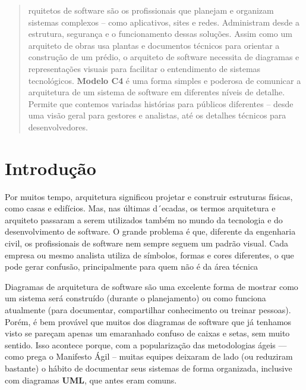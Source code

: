 \documentclass[a4paper,11pt]{article}
\begin{document}
	
\maketitle %
\thispagestyle{fancy} %


\begin{abstract}	
	rquitetos de software são os profissionais que planejam e organizam sistemas complexos -- como aplicativos, sites e redes. Administram desde a estrutura, segurança e o funcionamento dessas soluções. Assim como um arquiteto de obras usa plantas e documentos
	técnicos para orientar a construção de um prédio, o arquiteto de software necessita de diagramas e representações visuais para facilitar o entendimento de sistemas tecnológicos. \textbf{Modelo C4} é uma forma simples e poderosa de comunicar a arquitetura de um sistema de software em diferentes níveis de detalhe. Permite que contemos variadas histórias para públicos diferentes -- desde uma visão geral para gestores e analistas, até os detalhes técnicos para desenvolvedores.
\end{abstract}

\section{Introdução}
Por muitos tempo, arquitetura significou projetar e construir estruturas físicas, como casas e edifícios. Mas, nas últimas d´ecadas, os termos arquitetura e arquiteto passaram a serem utilizados também no mundo da tecnologia e do desenvolvimento de software. O grande problema é que, diferente da engenharia civil, os profissionais de software nem sempre seguem um padrão visual. Cada empresa ou mesmo analista utiliza de símbolos, formas e cores diferentes, o que pode gerar confusão, principalmente para quem não é da área técnica

Diagramas de arquitetura de software são uma excelente forma de mostrar como um sistema será
construído (durante o planejamento) ou como funciona atualmente (para documentar, compartilhar
conhecimento ou treinar pessoas). Porém, é bem provável que muitos dos diagramas de software que já tenhamos visto se pareçam apenas um emaranhado confuso de caixas e setas, sem muito sentido. Isso acontece porque, com a popularização das metodologias ágeis — como prega o Manifesto Ágil – muitas equipes deixaram de lado (ou reduziram bastante) o hábito de documentar seus sistemas de forma organizada, inclusive com diagramas \textbf{UML}, que antes eram comuns. 
\end{document}
